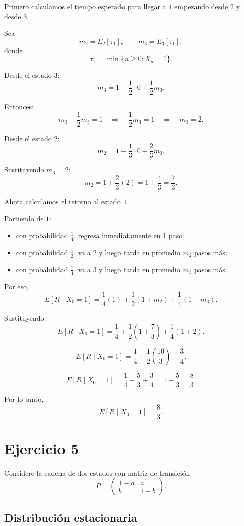 \documentclass[12pt]{article}
\begin{document}
Primero calculamos el tiempo esperado para llegar a \(1\) empezando desde \(2\) y desde \(3\).

Sea
\[
m_2=E_2[\tau_1],\qquad m_3=E_3[\tau_1],
\]
donde
\[
\tau_1=\min\{n\geq 0:X_n=1\}.
\]

Desde el estado \(3\):
\[
m_3=1+\frac12\cdot 0+\frac12 m_3.
\]

Entonces:
\[
m_3-\frac12 m_3=1
\quad\Longrightarrow\quad
\frac12 m_3=1
\quad\Longrightarrow\quad
m_3=2.
\]

Desde el estado \(2\):
\[
m_2=1+\frac13\cdot 0+\frac23 m_3.
\]

Sustituyendo \(m_3=2\):
\[
m_2=1+\frac23(2)=1+\frac43=\frac73.
\]

Ahora calculamos el retorno al estado \(1\).

Partiendo de \(1\):

\begin{itemize}
    \item con probabilidad \(\frac14\), regresa inmediatamente en 1 paso;
    \item con probabilidad \(\frac12\), va a \(2\) y luego tarda en promedio \(m_2\) pasos más;
    \item con probabilidad \(\frac14\), va a \(3\) y luego tarda en promedio \(m_3\) pasos más.
\end{itemize}

Por eso,
\[
E[R\mid X_0=1]
=
\frac14(1)+\frac12(1+m_2)+\frac14(1+m_3).
\]

Sustituyendo:
\[
E[R\mid X_0=1]
=
\frac14+\frac12\left(1+\frac73\right)+\frac14(1+2).
\]

\[
E[R\mid X_0=1]
=
\frac14+\frac12\left(\frac{10}{3}\right)+\frac34.
\]

\[
E[R\mid X_0=1]
=
\frac14+\frac{5}{3}+\frac34
=
1+\frac53
=
\frac83.
\]

Por lo tanto,
\[
\boxed{E[R\mid X_0=1]=\frac83}.
\]

\newpage
\section*{Ejercicio 5}

Considere la cadena de dos estados con matriz de transición
\[
P=
\begin{pmatrix}
1-a & a\\
b & 1-b
\end{pmatrix}.
\]

\subsection*{Distribución estacionaria}
\end{document}

